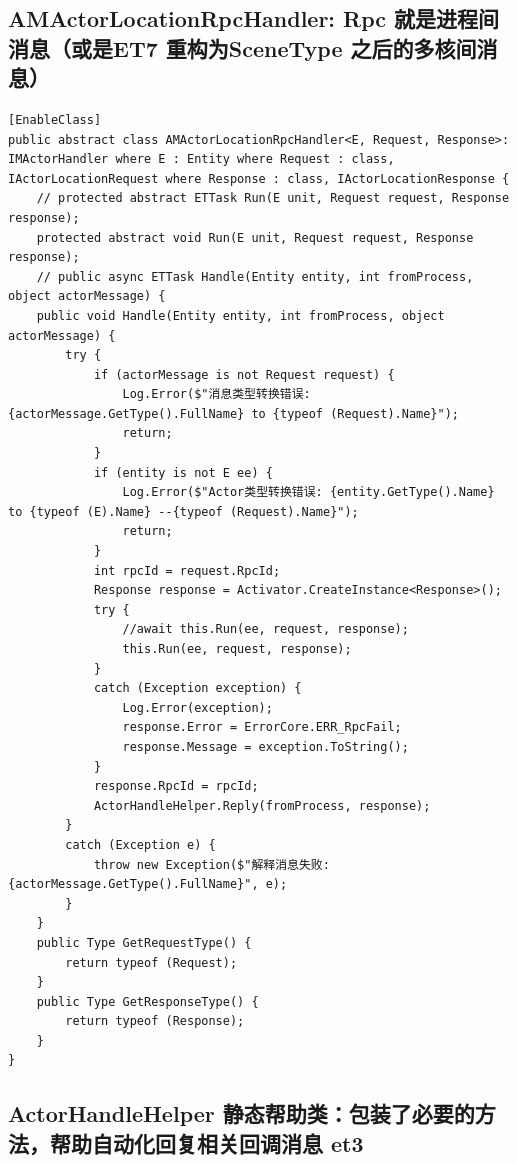 \documentclass[9pt, b5paper]{article}
\begin{document}
\subsection{AMActorLocationRpcHandler: Rpc 就是进程间消息（或是ET7 重构为SceneType 之后的多核间消息）}
\label{sec:org9dd4852}
\begin{verbatim}
[EnableClass]
public abstract class AMActorLocationRpcHandler<E, Request, Response>: IMActorHandler where E : Entity where Request : class, IActorLocationRequest where Response : class, IActorLocationResponse {
    // protected abstract ETTask Run(E unit, Request request, Response response);
    protected abstract void Run(E unit, Request request, Response response);
    // public async ETTask Handle(Entity entity, int fromProcess, object actorMessage) {
    public void Handle(Entity entity, int fromProcess, object actorMessage) {
        try {
            if (actorMessage is not Request request) {
                Log.Error($"消息类型转换错误: {actorMessage.GetType().FullName} to {typeof (Request).Name}");
                return;
            }
            if (entity is not E ee) {
                Log.Error($"Actor类型转换错误: {entity.GetType().Name} to {typeof (E).Name} --{typeof (Request).Name}");
                return;
            }
            int rpcId = request.RpcId;
            Response response = Activator.CreateInstance<Response>();
            try {
                //await this.Run(ee, request, response);
                this.Run(ee, request, response);
            }
            catch (Exception exception) {
                Log.Error(exception);
                response.Error = ErrorCore.ERR_RpcFail;
                response.Message = exception.ToString();
            }
            response.RpcId = rpcId;
            ActorHandleHelper.Reply(fromProcess, response);
        }
        catch (Exception e) {
            throw new Exception($"解释消息失败: {actorMessage.GetType().FullName}", e);
        }
    }
    public Type GetRequestType() {
        return typeof (Request);
    }
    public Type GetResponseType() {
        return typeof (Response);
    }
}
\end{verbatim}
\subsection{ActorHandleHelper 静态帮助类：包装了必要的方法，帮助自动化回复相关回调消息 et3}
\label{sec:org77a25e1}
\end{document}
